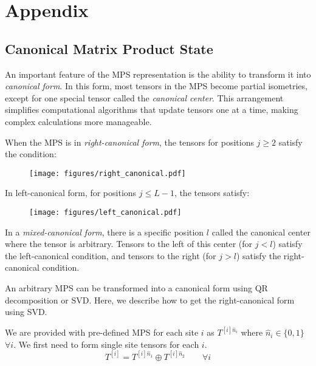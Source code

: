 \section{Appendix}

\subsection{Canonical Matrix Product State}\label{appendix:right_canonical}

An important feature of the MPS representation is the ability to transform it into \emph{canonical form}. In this form, most tensors in the MPS become partial isometries, except for one special tensor called the \emph{canonical center}. This arrangement simplifies computational algorithms that update tensors one at a time, making complex calculations more manageable. 

When the MPS is in \emph{right-canonical form}, the tensors for positions $j\geq2$ satisfy the condition:
\begin{figure}[ht!]
  \centering
  \texttt{[image: figures/right\_canonical.pdf]}\par
\end{figure}

In left-canonical form, for positions $j\leq L-1$, the tensors satisfy:

\begin{figure}[ht!]
  \centering
  \texttt{[image: figures/left\_canonical.pdf]}\par
\end{figure}

In a \emph{mixed-canonical form}, there is a specific position $l$ called the canonical center where the tensor is arbitrary. Tensors to the left of this center (for $j<l$) satisfy the left-canonical condition, and tensors to the right (for $j>l$) satisfy the right-canonical condition.

An arbitrary MPS can be transformed into a canonical form using QR decomposition or SVD. Here, we describe how to get the right-canonical form using SVD. 

We are provided with pre-defined MPS for each site $i$ as $T^{[i]\hat{n}_i}$ where $\hat{n}_i\in \{0,1\}$ $\forall i$. We first need to form single site tensors for each $i$.
\begin{equation}
T^{[i]} = T^{[i] \hat{n}_1 } \oplus T^{[i] \hat{n}_2 } \hspace{2em} \forall i
\end{equation}

